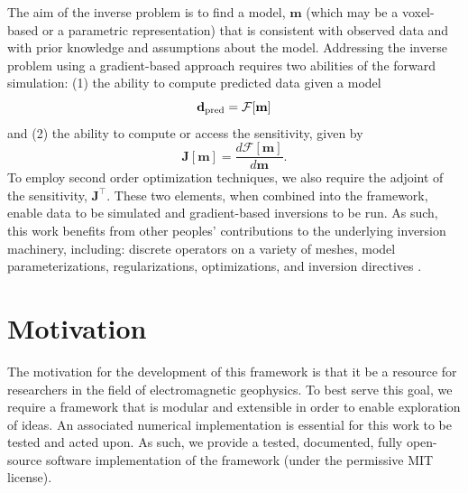 The aim of the inverse problem is to find a model, $\mathbf{m}$ (which may be a voxel-based or a parametric representation) that is consistent with observed data and with prior knowledge and assumptions about the model. Addressing the inverse problem using a gradient-based approach requires two abilities of the forward simulation: (1) the ability to compute predicted data given a model
\begin{equation}
\mathbf{d}_\text{pred} = \mathcal{F}[\mathbf{m}]
\label{eq:dpred}
\end{equation}
and (2) the ability to compute or access the sensitivity, given by
\begin{equation}
    \mathbf{J}[\mathbf{m}] = \frac{d \mathcal{F}[\mathbf{m}]}{ d \mathbf{m}}.
    \label{eq:sensitivityApp}
\end{equation}
To employ second order optimization techniques, we also require  the adjoint of the sensitivity, $\mathbf{J}^\top$. These two elements, when combined into the \SimPEG framework, enable data to be simulated and gradient-based inversions to be run. As such, this work benefits from other peoples' contributions to the underlying inversion machinery, including: discrete operators on a variety of meshes, model parameterizations, regularizations, optimizations, and inversion directives \citep{Cockett2015}.


\section{Motivation}
\label{sec:Motivation}

The motivation for the development of this framework is that it be a resource
for researchers in the field of electromagnetic geophysics. To best serve this
goal, we require a framework that is modular and extensible in order to enable
exploration of ideas. An associated numerical implementation is essential for
this work to be tested and acted upon. As such, we provide a tested,
documented, fully open-source software implementation of the framework (under the permissive MIT license).

